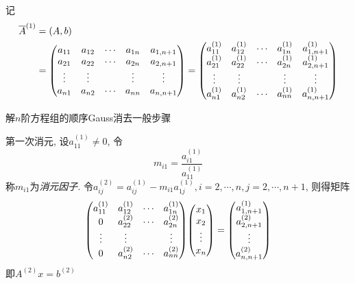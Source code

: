记
\begin{align*}
    \overline{A}^{(1)}&=(A,b)\\
    &=\mqty(
        a_{11}&a_{12}&\cdots&a_{1n}&a_{1,n+1}\\
        a_{21}&a_{22}&\cdots&a_{2n}&a_{2,n+1}\\
        \vdots&\vdots&&\vdots&\vdots\\
        a_{n1}&a_{n2}&\cdots&a_{nn}&a_{n,n+1}
    )=\mqty(
        a_{11}^{(1)}&a_{12}^{(1)}&\cdots&a_{1n}^{(1)}&a_{1,n+1}^{(1)}\\
        a_{21}^{(1)}&a_{22}^{(1)}&\cdots&a_{2n}^{(1)}&a_{2,n+1}^{(1)}\\
        \vdots&\vdots&&\vdots&\vdots\\
        a_{n1}^{(1)}&a_{n2}^{(1)}&\cdots&a_{nn}^{(1)}&a_{n,n+1}^{(1)}
    )
\end{align*}

解$n$阶方程组的顺序Gauss消去一般步骤

第一次消元, 设$a_{11}^{(1)}\ne0$, 令
\begin{equation*}
    m_{i1}=\frac{a_{i1}^{(1)}}{a_{11}^{(1)}}
\end{equation*}
称$m_{i1}$为\emph{消元因子}. 令$a_{ij}^{(2)}=a_{ij}^{(1)}-m_{i1}a_{1j}^{(1)}, i=2,\cdots,n, j=2,\cdots,n+1$, 则得矩阵
\begin{equation*}
    \mqty(
        a_{11}^{(1)}&a_{12}^{(1)}&\cdots&a_{1n}^{(1)}\\
        0&a_{22}^{(2)}&\cdots&a_{2n}^{(2)}\\
        \vdots&\vdots&&\vdots\\
        0&a_{n2}^{(2)}&\cdots&a_{nn}^{(2)}
    )\mqty(x_1\\x_2\\\vdots\\x_n)=\mqty(a_{1,n+1}^{(1)}\\a_{2,n+1}^{(2)}\\\vdots\\a_{n,n+1}^{(2)})
\end{equation*}
即$A^{(2)}x=b^{(2)}$

